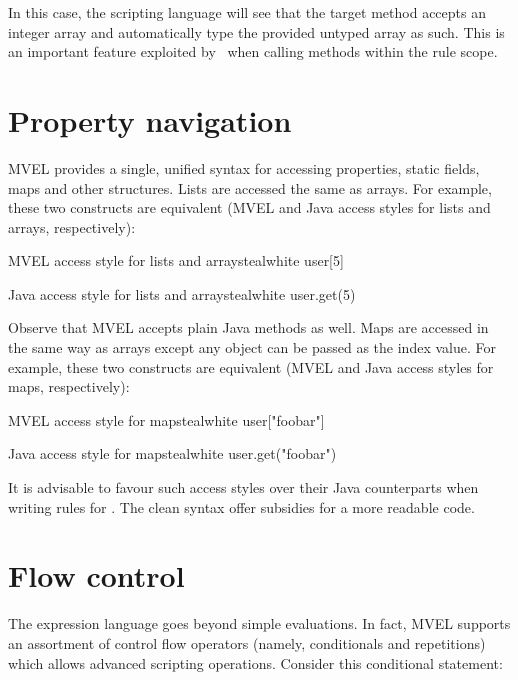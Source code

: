 In this case, the scripting language will see that the target method accepts an integer array and automatically type the provided untyped array as such. This is an important feature exploited by \arara\ when calling methods within the rule scope.

\section{Property navigation}
\label{sec:propertynavigation}

MVEL provides a single, unified syntax for accessing properties, static fields, maps and other structures. Lists are accessed the same as arrays. For example, these two constructs are equivalent (MVEL and Java access styles for lists and arrays, respectively):

\begin{codebox}{MVEL access style for lists and arrays}{teal}{\icnote}{white}
user[5]
\end{codebox}

\begin{codebox}{Java access style for lists and arrays}{teal}{\icnote}{white}
user.get(5)
\end{codebox}

Observe that MVEL accepts plain Java methods as well. Maps are accessed in the same way as arrays except any object can be passed as the index value. For example, these two constructs are equivalent (MVEL and Java access styles for maps, respectively):

\begin{codebox}{MVEL access style for maps}{teal}{\icnote}{white}
user["foobar"]
\end{codebox}

\begin{codebox}{Java access style for maps}{teal}{\icnote}{white}
user.get("foobar")
\end{codebox}

It is advisable to favour such access styles over their Java counterparts when writing rules for \arara. The clean syntax offer subsidies for a more readable code.

\section{Flow control}
\label{sec:mvelflowcontrol}

The expression language goes beyond simple evaluations. In fact, MVEL supports an assortment of control flow operators (namely, conditionals and repetitions) which allows advanced scripting operations. Consider this conditional statement:

